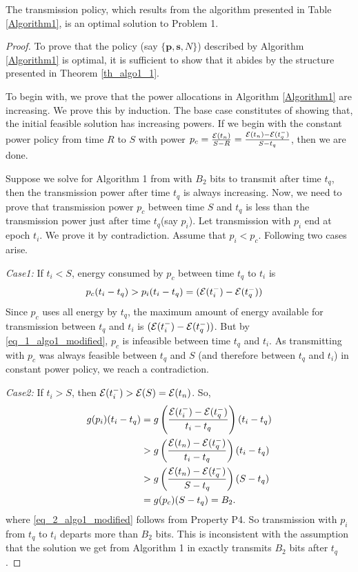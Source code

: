 \begin{theorem}
The transmission policy, which results from the algorithm presented in Table \ref{Algorithm1}, is an optimal solution to Problem 1.
\label{th_algo1_2}
\end{theorem}


\begin{proof}
To prove that the policy (say $\{\textbf{p},\textbf{s},N\}$) described by Algorithm \ref{Algorithm1} is optimal, it is sufficient to show that it abides by the structure presented in Theorem \ref{th_algo1_1}.

To begin with, we prove that the power allocations in Algorithm \ref{Algorithm1} are increasing. We prove this by induction. The base case constitutes of showing that, the initial feasible solution has increasing powers. If we begin with the constant power policy from time $R$ to $S$ with power $p_c=\frac{\mathcal{E}(t_n)}{S-R}=\frac{\mathcal{E}(t_n)-\mathcal{E}(t_q^-)}{S-t_q}$, then we are done. 

Suppose we solve for Algorithm 1 from \cite{Yang} with $B_2$ bits to transmit after time $t_q$, then the transmission power after time $t_q$ is always increasing. Now, we need to prove that transmission power $p_c$ between time $S$ and $t_q$ is less than the transmission power just after time $t_q$(say $p_i$). Let transmission with $p_i$ end at epoch $t_i$. We prove it by contradiction. Assume that $p_i<p_c$. Following two cases arise.

\textit{Case1:} If $t_i<S$, energy consumed by $p_c$ between time $t_q$ to $t_i$ is 
\begin{align}
&p_c(t_i-t_q)>p_i(t_i-t_q)=(\ETx(t_i^-)-\ETx(t_q^-))\label{eq_1_algo1_modified}
\end{align}
Since $p_c$ uses all energy by $t_q$, the maximum amount of energy available for transmission between $t_q$ and $t_i$ is $(\mathcal{E}(t_i^-)-\mathcal{E}(t_q^-))$. But by \eqref{eq_1_algo1_modified}, $p_c$ is infeasible between time $t_q$ and $t_i$. As transmitting with $p_c$ was always feasible between $t_q$ and $S$ (and therefore between $t_q$ and $t_i$) in constant power policy, we reach a contradiction.        

\textit{Case2:} If $t_i>S$, then $\mathcal{E}(t_i^-)>\mathcal{E}(S)=\mathcal{E}(t_n)$. So, 
\begin{align}
g(p_i)(t_i-t_q)&=g\left(\frac{\ETx(t_i^-)-\ETx(t_q^-)}{t_i-t_q}\right)(t_i-t_q)
\\
&>g\left(\frac{\ETx(t_n)-\ETx(t_q^-)}{t_i-t_q}\right)(t_i-t_q)
\\
&>g\left(\frac{\ETx(t_n)-\ETx(t_q^-)}{S-t_q}\right)(S-t_q)\label{eq_2_algo1_modified}
\\
&=g(p_c)(S-t_q)=B_2.
\end{align}
where \eqref{eq_2_algo1_modified} follows from Property P4. So transmission with $p_i$ from $t_q$ to $t_i$ departs more than $B_2$ bits. This is inconsistent with the assumption that the solution we get from Algorithm 1 in \cite{Yang} exactly transmits $B_2$ bits after $t_q$. 


\end{proof}

